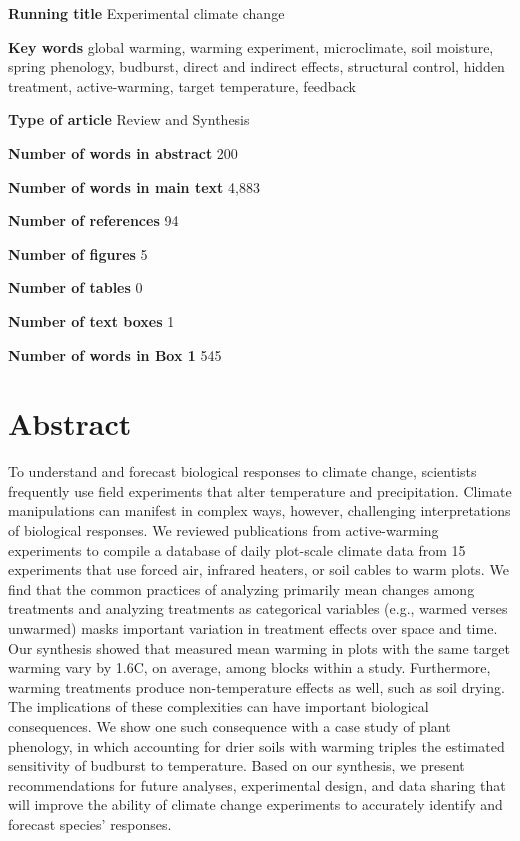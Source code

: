 \documentclass{article}
\begin{document}
\textbf{Running title} Experimental climate change

\textbf{Key words} global warming, warming experiment, microclimate, soil moisture, spring phenology, budburst, direct and indirect effects, structural control, hidden treatment, active-warming, target temperature, feedback

\textbf{Type of article} Review and Synthesis

\textbf{Number of words in abstract} 200

\textbf{Number of words in main text} 4,883%

\textbf{Number of references} 94

\textbf{Number of figures} 5

\textbf{Number of tables} 0

\textbf{Number of text boxes} 1

\textbf{Number of words in Box 1} 545

\clearpage

\clearpage
\linenumbers



\section*{Abstract}
\par To understand and forecast biological responses to climate change, scientists frequently use field experiments that alter temperature and precipitation. Climate manipulations can manifest in complex ways, however, challenging interpretations of biological responses. We reviewed publications from active-warming experiments to compile a database of daily plot-scale climate data from 15 experiments that use forced air, infrared heaters, or soil cables to warm plots. We find that the common practices of analyzing primarily mean changes among treatments and analyzing treatments as categorical variables (e.g., warmed verses unwarmed) masks important variation in treatment effects over space and time. Our synthesis showed that measured mean warming in plots with the same target warming vary by 1.6\degree C, on average, among blocks within a study. Furthermore, warming treatments produce non-temperature effects as well, such as soil drying. The implications of these complexities can have important biological consequences. We show one such consequence with a case study of plant phenology, in which accounting for drier soils with warming triples the estimated sensitivity of budburst to temperature. Based on our synthesis, we present recommendations for future analyses, experimental design, and data sharing that will improve the ability of climate change experiments to accurately identify and forecast species' responses.
\end{document}
